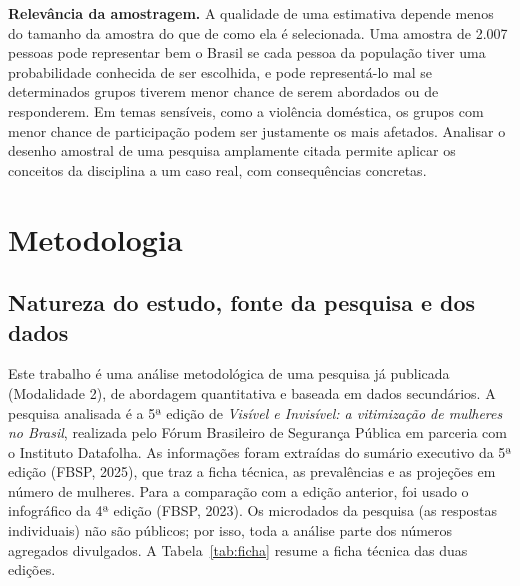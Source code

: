 \documentclass[12pt,a4paper]{article}
\begin{document}
\textbf{Relevância da amostragem.} A qualidade de uma estimativa depende menos do tamanho da amostra do que de como ela é selecionada. Uma amostra de 2.007 pessoas pode representar bem o Brasil se cada pessoa da população tiver uma probabilidade conhecida de ser escolhida, e pode representá-lo mal se determinados grupos tiverem menor chance de serem abordados ou de responderem. Em temas sensíveis, como a violência doméstica, os grupos com menor chance de participação podem ser justamente os mais afetados. Analisar o desenho amostral de uma pesquisa amplamente citada permite aplicar os conceitos da disciplina a um caso real, com consequências concretas.

\newpage

\section{Metodologia}

\subsection{Natureza do estudo, fonte da pesquisa e dos dados}

Este trabalho é uma análise metodológica de uma pesquisa já publicada (Modalidade 2), de abordagem quantitativa e baseada em dados secundários. A pesquisa analisada é a 5ª edição de \textit{Visível e Invisível: a vitimização de mulheres no Brasil}, realizada pelo Fórum Brasileiro de Segurança Pública em parceria com o Instituto Datafolha. As informações foram extraídas do sumário executivo da 5ª edição (FBSP, 2025), que traz a ficha técnica, as prevalências e as projeções em número de mulheres. Para a comparação com a edição anterior, foi usado o infográfico da 4ª edição (FBSP, 2023). Os microdados da pesquisa (as respostas individuais) não são públicos; por isso, toda a análise parte dos números agregados divulgados. A Tabela~\ref{tab:ficha} resume a ficha técnica das duas edições.
\end{document}

